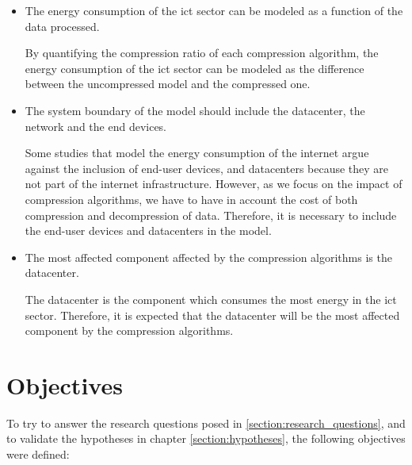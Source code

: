 \begin{itemize}
    \item The energy consumption of the \ac{ict} sector can be modeled as a function of the data processed.

    By quantifying the compression ratio of each compression algorithm, the energy consumption of the \ac{ict} sector can be modeled as the difference between the uncompressed model and the compressed one.


    \item The system boundary of the model should include the datacenter, the network and the end devices. 
    
    Some studies that model the energy consumption of the internet argue against the inclusion of end-user devices, and datacenters because they are not part of the internet infrastructure. However, as we focus on the impact of compression algorithms, we have to have in account the cost of both compression and decompression of data. Therefore, it is necessary to include the end-user devices and datacenters in the model.

    \item The most affected component affected by the compression algorithms is the datacenter.

    The datacenter is the component which consumes the most energy in the \ac{ict} sector. Therefore, it is expected that the datacenter will be the most affected component by the compression algorithms.

\end{itemize}


\section{Objectives}

To try to answer the research questions posed in \ref{section:research_questions}, and to validate the hypotheses in chapter \ref{section:hypotheses}, the following objectives were defined:

